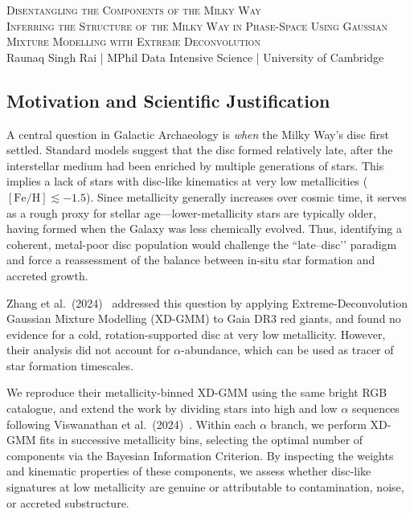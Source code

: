 \documentclass[a4paper,10pt]{article}
\begin{document}
\begin{center}
    {\Large \textsc{Disentangling the Components of the Milky Way}}\\[0.2cm]
    {\textsc{Inferring the Structure of the Milky Way in Phase-Space Using Gaussian Mixture Modelling with Extreme Deconvolution}}\\[0.2cm]
    Raunaq Singh Rai \quad | \quad MPhil Data Intensive Science \quad | \quad University of Cambridge
\end{center}

\begin{multicols}{2}

\subsection*{Motivation and Scientific Justification}

A central question in Galactic Archaeology is \emph{when} the Milky Way’s disc first settled.  
Standard models suggest that the disc formed relatively late, after the interstellar medium had been enriched by multiple generations of stars. 
This implies a lack of stars with disc-like kinematics at very low metallicities ($[\mathrm{Fe/H}] \lesssim -1.5$). 
Since metallicity generally increases over cosmic time, it serves as a rough proxy for stellar age—lower-metallicity stars are typically older, having formed when the Galaxy was less chemically evolved. 
Thus, identifying a coherent, metal-poor disc population would challenge the “late–disc’’ paradigm and force a reassessment of the balance between in-situ star formation and accreted growth.

Zhang et al.\ (2024)~\cite{zhang2024existencemetalpoordiscmilky} addressed this question by applying Extreme-Deconvolution Gaussian Mixture Modelling (XD-GMM) to Gaia DR3 red giants, and found no evidence for a cold, rotation-supported disc at very low metallicity.  
However, their analysis did not account for $\alpha$-abundance, which can be used as tracer of star formation timescales.

We reproduce their metallicity-binned XD-GMM using the same bright RGB catalogue, and extend the work by dividing stars into high and low $\alpha$ sequences following Viswanathan et al.\ (2024)~\cite{Vis2024}.  
Within each $\alpha$ branch, we perform XD-GMM fits in successive metallicity bins, selecting the optimal number of components via the Bayesian Information Criterion.  
By inspecting the weights and kinematic properties of these components, we assess whether disc-like signatures at low metallicity are genuine or attributable to contamination, noise, or accreted substructure.


\end{multicols}
\end{document}
